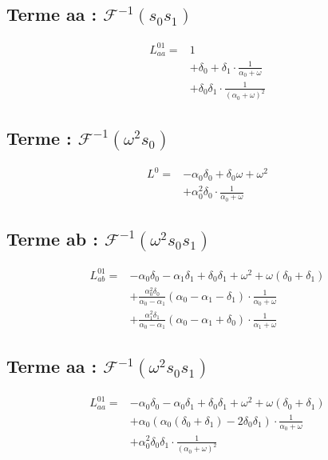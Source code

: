 \documentclass[a4paper,10pt]{article}
\begin{document}
\subsection{Terme  aa : $\mathcal{F}^{-1}(s_{0}s_{1})$}

\begin{align*}
 L^{01}_{aa}  =&1\\
&+ \delta_{0} + \delta_{1} \cdot \frac{1}{\alpha_{0} + \omega}\\
&+ \delta_{0} \delta_{1} \cdot \frac{1}{\left(\alpha_{0} + \omega\right)^{2}}
\end{align*}
\subsection{Terme : $\mathcal{F}^{-1}(\omega^{2}s_{0})$}

\begin{align*}
 L^{0}  =&- \alpha_{0} \delta_{0} + \delta_{0} \omega + \omega^{2}\\
&+ \alpha_{0}^{2} \delta_{0} \cdot \frac{1}{\alpha_{0} + \omega}
\end{align*}
\subsection{Terme  ab : $\mathcal{F}^{-1}(\omega^{2}s_{0}s_{1})$}

\begin{align*}
 L^{01}_{ab}  =&- \alpha_{0} \delta_{0} - \alpha_{1} \delta_{1} + \delta_{0} \delta_{1} + \omega^{2} + \omega \left(\delta_{0} + \delta_{1}\right)\\
&+ \frac{\alpha_{0}^{2} \delta_{0}}{\alpha_{0} - \alpha_{1}} \left(\alpha_{0} - \alpha_{1} - \delta_{1}\right) \cdot \frac{1}{\alpha_{0} + \omega}\\
&+ \frac{\alpha_{1}^{2} \delta_{1}}{\alpha_{0} - \alpha_{1}} \left(\alpha_{0} - \alpha_{1} + \delta_{0}\right) \cdot \frac{1}{\alpha_{1} + \omega}
\end{align*}
\subsection{Terme  aa : $\mathcal{F}^{-1}(\omega^{2}s_{0}s_{1})$}

\begin{align*}
 L^{01}_{aa}  =&- \alpha_{0} \delta_{0} - \alpha_{0} \delta_{1} + \delta_{0} \delta_{1} + \omega^{2} + \omega \left(\delta_{0} + \delta_{1}\right)\\
&+ \alpha_{0} \left(\alpha_{0} \left(\delta_{0} + \delta_{1}\right) - 2 \delta_{0} \delta_{1}\right) \cdot \frac{1}{\alpha_{0} + \omega}\\
&+ \alpha_{0}^{2} \delta_{0} \delta_{1} \cdot \frac{1}{\left(\alpha_{0} + \omega\right)^{2}}
\end{align*}
\end{document}
